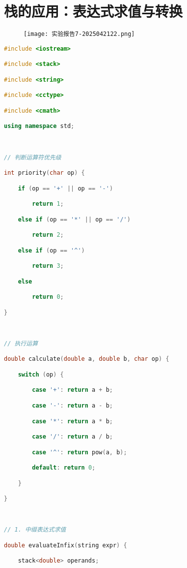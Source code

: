 \section{栈的应用：表达式求值与转换}

\begin{figure}[H]
\centering
\texttt{[image: 实验报告7-2025042122.png]}
\label{}
\end{figure}

\begin{lstlisting}[language=C++]
#include <iostream>

#include <stack>

#include <string>

#include <cctype>

#include <cmath>

using namespace std;

  

// 判断运算符优先级

int priority(char op) {

    if (op == '+' || op == '-')

        return 1;

    else if (op == '*' || op == '/')

        return 2;

    else if (op == '^')

        return 3;

    else

        return 0;

}

  

// 执行运算

double calculate(double a, double b, char op) {

    switch (op) {

        case '+': return a + b;

        case '-': return a - b;

        case '*': return a * b;

        case '/': return a / b;

        case '^': return pow(a, b);

        default: return 0;

    }

}

  

// 1. 中缀表达式求值

double evaluateInfix(string expr) {

    stack<double> operands;


\end{lstlisting}

